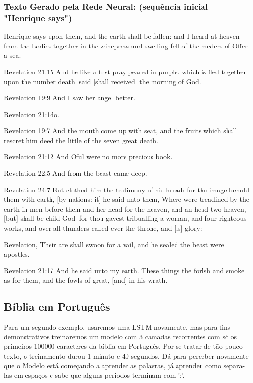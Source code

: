 \documentclass[a4paper,12pt]{article}
\begin{document}
\subsubsection*{\textbf{Texto Gerado pela Rede Neural}: (sequência inicial "Henrique says")}
      Henrique says upon them, and the earth shall be fallen: and I heard at heaven from the bodies together in the winepress and swelling fell of the meders of Offer a sea.
      
      Revelation 21:15        And he like a first pray peared in purple: which is fled together upon the number death, said [shall received] the morning of God.
      
      Revelation 19:9 And I saw her angel better.
      
      Revelation 21:1do.
      
      Revelation 19:7 And the mouth come up with seat, and the fruits which shall rescret him deed the little of the seven great death.
      
      Revelation 21:12        And Oful were no more precious book.
      
      Revelation 22:5 And from the beast came deep.
      
      Revelation 24:7 But clothed him the testimony of his hread: for the image behold them with earth, [by nations: it] he said unto them, Where were treadined by the earth in men before them and her head for the heaven, and an head two heaven, [but] shall be child God: for thou gavest tribualling a woman, and four righteous works, and over all thunders called ever the throne, and [is] glory:
      
      Revelation, Their are shall swoon for a vail, and he sealed the beast were apostles.
      
      Revelation 21:17        And he said unto my earth. These things the forlsh and smoke as for them, and the fowls of great, [and] in his wrath.

\subsection{Bíblia em Português}
    Para um segundo exemplo, usaremos uma LSTM novamente, mas para fins demonstrativos treinaremos um modelo com 3 camadas recorrentes com só os primeiros
    100000 caracteres da bíblia em Português. Por se tratar de tão pouco texto, o treinamento durou 1 minuto e 40 segundos. Dá para perceber novamente que o Modelo está 
    começando a aprender as palavras, já aprendeu como separa-las em espaços e sabe que alguns periodos terminam com ';'.
\end{document}

